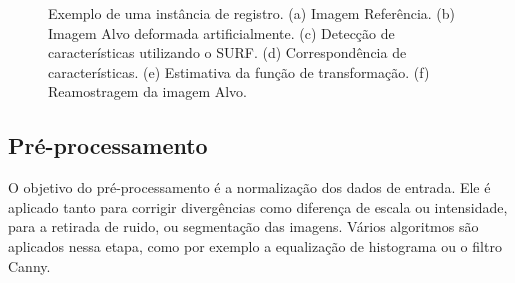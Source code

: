 \begin{figure}[H]
\begin{subfigure}[t]{0.3\textwidth}
      \label{fig:lenaRegistrada}
    \end{subfigure}
    \caption{Exemplo de uma instância de registro. (a) Imagem Referência.
             (b) Imagem Alvo deformada artificialmente.
             (c) Detecção de características utilizando o SURF.
             (d) Correspondência de características.
             (e) Estimativa da função de transformação.
             (f) Reamostragem da imagem Alvo.}
    \label{fig:regExplicacao}
\end{figure}

\subsection{Pré-processamento}
  O objetivo do pré-processamento é a normalização dos dados de entrada. Ele é 
aplicado tanto para corrigir divergências como diferença de escala ou intensidade,
para a retirada de ruido, ou segmentação das imagens. Vários algoritmos são 
aplicados nessa etapa, como por exemplo a equalização de histograma ou o filtro Canny.

